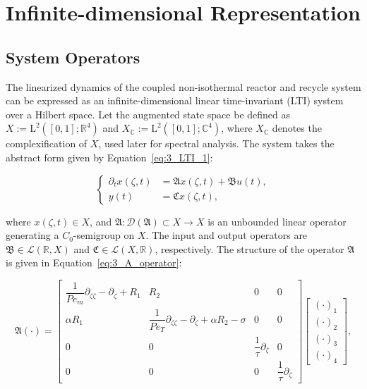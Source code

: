 \section{Infinite-dimensional Representation} \label{sec:3_3_LTI}

\subsection{System Operators}

The linearized dynamics of the coupled non-isothermal reactor and recycle system can be expressed as an infinite-dimensional linear time-invariant (LTI) system over a Hilbert space. Let the augmented state space be defined as $X := \mathrm{L}^2([0,1]; \mathbb{R}^4)$ and $X_\mathbb{C} := \mathrm{L}^2([0,1]; \mathbb{C}^4)$, where $X_\mathbb{C}$ denotes the complexification of $X$, used later for spectral analysis. The system takes the abstract form given by Equation~\eqref{eq:3_LTI_1}:

\begin{equation} \label{eq:3_LTI_1}
\begin{cases}
\partial_t x(\zeta, t) &= \mathfrak{A} x(\zeta, t) + \mathfrak{B} u(t), \\
y(t) &= \mathfrak{C} x(\zeta, t),
\end{cases}
\end{equation}

where $x(\zeta, t) \in X$, and $\mathfrak{A} : \mathcal{D}(\mathfrak{A}) \subset X \to X$ is an unbounded linear operator generating a $C_0$-semigroup on $X$. The input and output operators are $\mathfrak{B} \in \mathcal{L}(\mathbb{R}, X)$ and $\mathfrak{C} \in \mathcal{L}(X, \mathbb{R})$, respectively. The structure of the operator $\mathfrak{A}$ is given in Equation~\eqref{eq:3_A_operator}:

\begin{equation} \label{eq:3_A_operator}
\mathfrak{A} (\cdot) =
\begin{bmatrix} 
\dfrac{1}{Pe_m} \partial_{\zeta\zeta} - \partial_\zeta + R_1 & R_2 & 0 & 0 \\
\alpha R_1 & \dfrac{1}{Pe_T} \partial_{\zeta\zeta} - \partial_\zeta + \alpha R_2 - \sigma & 0 & 0 \\
0 & 0 & \dfrac{1}{\tau} \partial_\zeta & 0 \\
0 & 0 & 0 & \dfrac{1}{\tau} \partial_\zeta
\end{bmatrix} \begin{bmatrix} (\cdot)_1 \\ (\cdot)_2 \\ (\cdot)_3 \\ (\cdot)_4 \end{bmatrix},
\end{equation}

